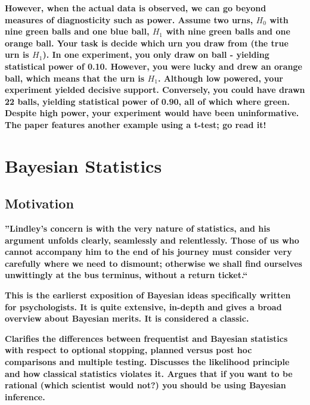 \documentclass[12pt]{scrartcl}
\begin{document}
\begin{description}
  \textbf{However, when the actual data is observed, we can go beyond measures of diagnosticity such as power. Assume two urns, $H_0$ with nine green balls and one blue ball, $H_1$ with nine green balls and one orange ball. Your task is decide which urn you draw from (the true urn is $H_1$). In one experiment, you only draw on ball - yielding statistical power of 0.10. However, you were lucky and drew an orange ball, which means that the urn is $H_1$. Although low powered, your experiment yielded decisive support. Conversely, you could have drawn 22 balls, yielding statistical power of 0.90, all of which where green. Despite high power, your experiment would have been uninformative. The paper features another example using a t-test; go read it!}
\end{description}

\section{Bayesian Statistics}

\subsection{Motivation}
\begin{description}

  \item {}
  
  \textbf{''Lindley's concern is with the very nature of statistics, and his
argument unfolds clearly, seamlessly and relentlessly. Those of us who cannot accompany him to the end
of his journey must consider very carefully where we need to dismount; otherwise we shall find ourselves
unwittingly at the bus terminus, without a return ticket.``}

  \item {}
  
  \textbf{This is the earlierst exposition of Bayesian ideas specifically written for psychologists. It is quite extensive, in-depth and gives a broad overview about Bayesian merits. It is considered a classic.}
  
  \item {}
  \item {}
  \item {}
  \item {}
  
  \textbf{Clarifies the differences between frequentist and Bayesian statistics with respect to optional stopping, planned versus post hoc comparisons and multiple testing. Discusses the likelihood principle and how classical statistics violates it. Argues that if you want to be rational (which scientist would not?) you should be using Bayesian inference.
  }
  
  \item {}
  \item {}
  \item {}
\end{description}
\end{document}
